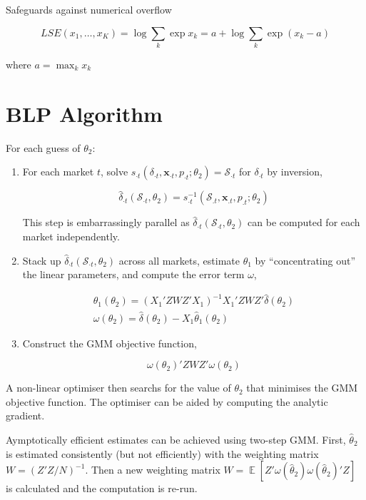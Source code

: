\documentclass[parskip=half]{scrartcl}
\DeclareMathOperator{\E}{\mathbb{E}}
\begin{document}
Safeguards against numerical overflow

\begin{equation}
LSE(x_1, \dots, x_K) = \log \sum_k \exp x_k = a + \log \sum_k \exp (x_k - a)
\end{equation}

where \(a = \max_k x_k\)

\section{BLP Algorithm}

For each guess of \(\theta_2\):

\begin{enumerate}

\item For each market \(t\), solve \(s_{\cdot t}(\delta_{\cdot t}, \boldsymbol{x}_{\cdot t}, p_{\cdot t}; \theta_2) = \mathcal{S}_{\cdot t}\) for \(\delta_{\cdot t}\) by inversion,


\begin{equation}
\hat\delta_{\cdot t}( \mathcal{S}_{\cdot t}, \theta_2) = s^{-1}_{\cdot t}(\mathcal{S}_{.t}, \boldsymbol{x}_{.t}, p_{.t}; \theta_2)
\end{equation}

This step is embarrassingly parallel as \(\hat\delta_{\cdot t}( \mathcal{S}_{\cdot t}, \theta_2)\) can be computed for each market independently.

\item Stack up \(\hat\delta_{\cdot t}( \mathcal{S}_{\cdot t}, \theta_2)\) across all markets, estimate \(\theta_1\) by ``concentrating out'' the linear parameters, and compute the error term \(\omega\),

\begin{gather}
\hat{\theta}_1(\theta_2) = (X_1'ZWZ'X_1)^{-1}X_1'ZWZ'\hat{\delta}(\theta_2) \\
\omega(\theta_2) = \hat{\delta}(\theta_2) - X_1 \hat{\theta}_1(\theta_2)
\end{gather}

\item Construct the GMM objective function,

\begin{equation}
\omega(\theta_2)' Z W Z' \omega(\theta_2)
\end{equation}

\end{enumerate}


A non-linear optimiser then searchs for the value of \(\theta_2\) that minimises the GMM objective function. The optimiser can be aided by computing the analytic gradient.

Aymptotically efficient estimates can be achieved using two-step GMM. First, \(\hat{\theta}_2\) is estimated consistently (but not efficiently) with the weighting matrix \(W = (Z'Z/N)^{-1}\). Then a new weighting matrix \(W = \E[Z'\omega(\hat{\theta}_2)\omega(\hat{\theta}_2)'Z]\) is calculated and the computation is re-run.
\end{document}
